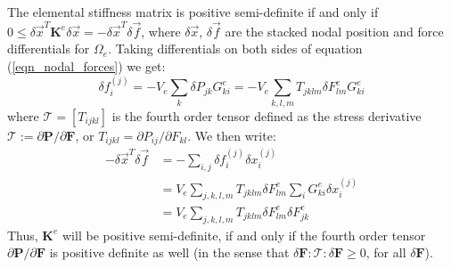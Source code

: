 The elemental stiffness matrix is positive semi-definite if and only if
$0\leq\delta\vec{x}^T\mathbf{K}^e\delta\vec{x}=-\delta\vec{x}^T\delta\vec{f}$, where $\delta\vec{x}$, $\delta\vec{f}$ are the stacked nodal position and force differentials for
$\Omega_e$. Taking differentials on both sides of equation (\ref{eqn_nodal_forces}) we get: 
$$
\delta f_i^{(j)}
=-V_e\sum_k\delta P_{jk}G_{ki}^e
=-V_e\sum_{k,l,m}T_{jklm}\delta F^e_{lm}G_{ki}^e
$$
where $\mathcal{T}=[T_{ijkl}]$ is the fourth order tensor defined as the stress derivative $\mathcal{T}:=\partial\mathbf{P}/\partial\mathbf{F}$, or $T_{ijkl}=\partial P_{ij}/\partial
F_{kl}$. We then write:
\begin{align*}
-\delta\vec{x}^T\delta\vec{f}&=-\sum_{i,j}\delta f_i^{(j)}\delta x_i^{(j)}\\
&=V_e\!\!\sum_{j,k,l,m}\!\!T_{jklm}\delta F^e_{lm}\sum_iG_{ki}^e\delta
x_i^{(j)}\\
&=V_e\!\!\sum_{j,k,l,m}\!\!T_{jklm}\delta F^e_{lm}\delta F^e_{jk}
\end{align*}
Thus, $\mathbf{K}^e$ will be positive semi-definite, if and only if the fourth order tensor $\partial\mathbf{P}/\partial\mathbf{F}$ is positive definite as well (in the sense that
$\delta\mathbf{F}:\mathcal{T}:\delta\mathbf{F}\geq 0$, for all
$\delta\mathbf{F}$). 

